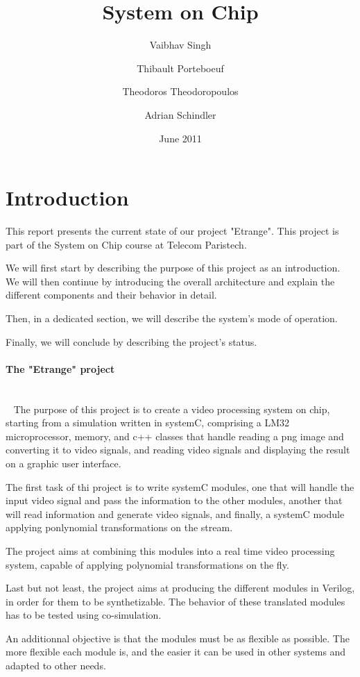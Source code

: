 \documentclass[a4paper,10pt]{article}
\begin{document}
\title{System on Chip}

\author{Vaibhav Singh \and Thibault Porteboeuf \and Theodoros
Theodoropoulos \and Adrian Schindler}

\date{June 2011}
\maketitle

\tableofcontents

\section{Introduction} 

This report presents the current state of our project "Etrange". This project is part of the System on Chip course at Telecom Paristech.

We will first start by describing the purpose of this project as an introduction. We will then continue by introducing the overall architecture and explain the different components and their behavior in detail.

Then, in a dedicated section, we will describe the system's mode of operation.

Finally, we will conclude by describing the project's status.


\paragraph{The "Etrange" project}
~\\~
The purpose of this project is to create a video processing system on chip, starting from a simulation written in systemC, comprising a LM32 microprocessor, memory, and c++ classes that handle reading a png image and converting it to video signals, and reading video signals and displaying the result on a graphic user interface.

The first task of thi project is to write systemC modules, one that will handle the input video signal and pass the information to the other modules, another that will read information and generate video signals, and finally, a systemC module applying ponlynomial transformations on the stream.

The project aims at combining this modules into a real time video processing system, capable of applying polynomial transformations on the fly.

Last but not least, the project aims at producing the different modules in Verilog, in order for them to be synthetizable. The behavior of these translated modules has to be tested using co-simulation.

An additionnal objective is that the modules must be as flexible as possible. The more flexible each module is, and the easier it can be used in other systems and adapted to other needs.








\end{document}
